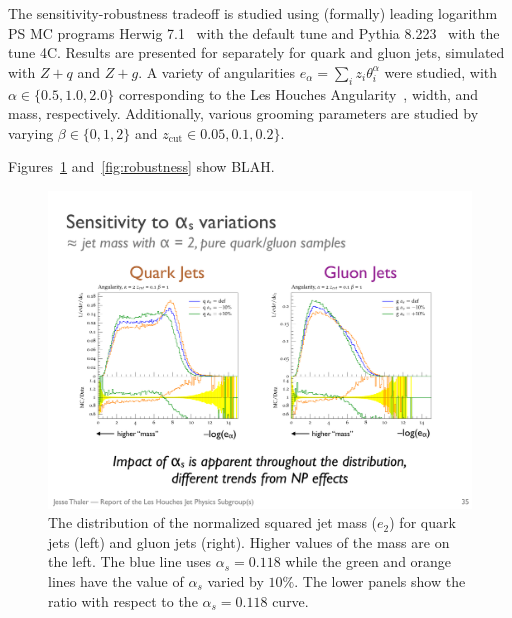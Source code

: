 The sensitivity-robustness tradeoff is studied using (formally) leading logarithm PS MC programs Herwig 7.1~\cite{Bellm:2015jjp,Reichelt:2017hts} with the default tune and Pythia 8.223~\cite{Sjostrand:2006za,Sjostrand:2014zea} with the tune 4C.  Results are presented for separately for quark and gluon jets, simulated with $Z+q$ and $Z+g$.  A variety of angularities $e_\alpha=\sum_iz_i\theta_i^\alpha$ were studied, with $\alpha\in\{0.5,1.0, 2.0\}$ corresponding to the Les Houches Angularity~\cite{Gras:2017jty}, width, and mass, respectively.  Additionally, various grooming parameters are studied by varying $\beta\in\{0,1,2\}$ and $z_\text{cut}\in 0.05,0.1,0.2\}$.  

Figures~\ref{fig:sensitivity} and~\ref{fig:robustness} show BLAH.

\begin{figure}[h!]
\begin{center}
\includegraphics[width = 0.99\columnwidth]{figures/sensitivity.pdf}
\end{center}
\caption{The distribution of the normalized squared jet mass ($e_2$) for quark jets (left) and gluon jets (right).  Higher values of the mass are on the left.  The blue line uses $\alpha_s=0.118$ while the green and orange lines have the value of $\alpha_s$ varied by $10\%$.  The lower panels show the ratio with respect to the $\alpha_s=0.118$ curve.}
\label{fig:sensitivity}
\end{figure}

